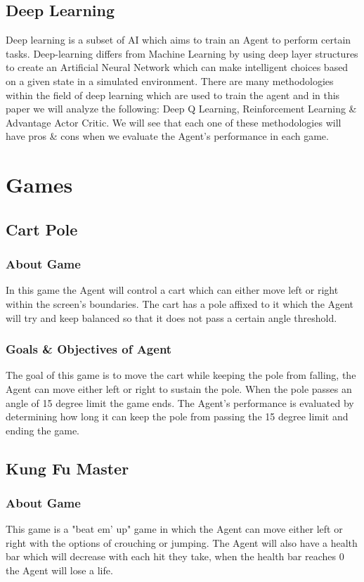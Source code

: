 \documentclass[conference]{IEEEtran}
\begin{document}
\subsection{Deep Learning}
Deep learning is a subset of AI which aims to train an Agent to perform certain tasks.  Deep-learning differs from Machine Learning by using deep layer structures to create an Artificial Neural Network which can make intelligent choices based on a given state in a simulated environment.  There are many methodologies within the field of deep learning which are used to train the agent and in this paper we will analyze the following: Deep Q Learning, Reinforcement Learning \& Advantage Actor Critic.  We will see that each one of these methodologies will have pros \& cons when we evaluate the Agent's performance in each game.
\section{Games}
\subsection{Cart Pole}
\subsubsection{About Game}
In this game the Agent will control a cart which can either move left or right within the screen's boundaries.  The cart has a pole affixed to it which the Agent will try and keep balanced so that it does not pass a certain angle threshold.
\subsubsection{Goals \& Objectives of Agent}
The goal of this game is to move the cart while keeping the pole from falling, the Agent can move either left or right to sustain the pole.  When the pole passes an angle of 15 degree limit the game ends.  The Agent's performance is evaluated by determining how long it can keep the pole from passing the 15 degree limit and ending the game.
\subsection{Kung Fu Master}
\subsubsection{About Game}
This game is a "beat em' up" game in which the Agent can move either left or right with the options of crouching or jumping.  The Agent will also have a health bar which will decrease with each hit they take, when the health bar reaches 0 the Agent will lose a life.  
\end{document}

